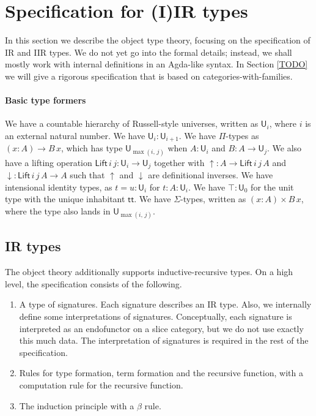 \documentclass[acmsmall,screen,review,anonymous]{acmart}
\newcommand{\msf}[1]{{\mathsf{#1}}}
\newcommand{\U}{\msf{U}}
\newcommand{\Lift}{\msf{Lift}}
\newcommand{\lup}{\uparrow}
\newcommand{\ldown}{\downarrow}
\newcommand{\ttt}{\msf{tt}}
\begin{document}
\section{Specification for (I)IR types}\label{sec:specification}

In this section we describe the object type theory, focusing on the specification of IR and IIR
types. We do not yet go into the formal details; instead, we shall mostly work with internal
definitions in an Agda-like syntax. In Section \ref{TODO} we will give a rigorous specification that
is based on categories-with-families.

\paragraph{Basic type formers} We have a countable hierarchy of Russell-style universes, written as $\U_i$, where $i$ is an
external natural number. We have $\U_i : \U_{i + 1}$. We have $\Pi$-types as $(x : A) \to B\,x$,
which has type $\U_{\max(i,\,j)}$ when $A : \U_i$ and $B : A \to \U_j$. We also have a lifting
operation $\Lift\,i\,j : \U_i \to \U_j$ together with $\lup : A \to \Lift\,i\,j\,A$ and $\ldown :
\Lift\,i\,j\,A \to A$ such that $\lup$ and $\ldown$ are definitional inverses. We have intensional
identity types, as $t = u : \U_i$ for $t : A : \U_i$.  We have $\top : \U_0$ for the unit type with
the unique inhabitant $\ttt$. We have $\Sigma$-types, written as $(x : A) \times B\,x$, where the type
also lands in $\U_{\max(i,\,j)}$.

\subsection{IR types}
The object theory additionally supports inductive-recursive types. On a high level, the specification consists
of the following.
\begin{enumerate}
\item A type of signatures. Each signature describes an IR type. Also, we internally define some
  interpretations of signatures. Conceptually, each signature is interpreted as an endofunctor on a
  slice category, but we do not use exactly this much data. The interpretation of signatures is
  required in the rest of the specification.
\item Rules for type formation, term formation and the recursive function, with a computation rule
  for the recursive function.
\item The induction principle with a $\beta$ rule.
\end{enumerate}
\end{document}
